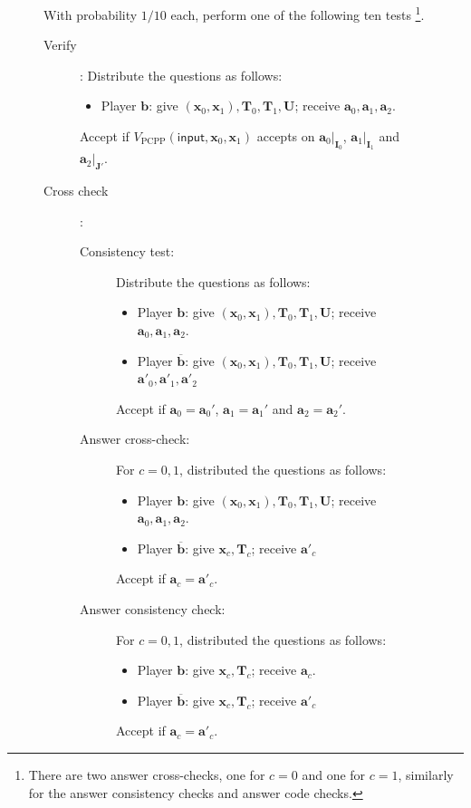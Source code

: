 \documentclass[10pt,a4paper]{article}
\theoremstyle{plain}
\theoremstyle{definition}
\newenvironment{Algorithm}{\begin{framed}}{\end{framed}}
\newcommand{\1}{\mathbb{1}} %
\newcommand{\ba}{\pmb{a}}
\newcommand{\bb}{\pmb{b}}
\newcommand{\bx}{\pmb{x}}
\newcommand{\bI}{\pmb{I}}
\newcommand{\bJ}{\pmb{J}}
\newcommand{\bT}{\pmb{T}}
\newcommand{\bU}{\pmb{U}}
\newcommand{\PCPP}{\mathrm{PCPP}}
\newcommand{\ipt}{\mathsf{input}}
\begin{document}
\begin{figure}
\begin{center}
{\begin{minipage}{0.9\linewidth}
\begin{Algorithm}
            With probability $1/10$ each, perform one of the following ten tests
            \footnote{There are two answer cross-checks, one for $c=0$ and one for $c=1$, similarly for the 
            answer consistency checks and answer code checks.}.
    \begin{description}
    	\item[Verify]: Distribute the questions as follows:
    		\begin{itemize}
    		\item
    		Player $\bb$: give $(\bx_0, \bx_1), \bT_0, \bT_1, \bU$; receive $\ba_0, \ba_1, \ba_2$.
    		\end{itemize}
    	Accept if $V_{\PCPP}(\ipt, \bx_0, \bx_1)$ accepts on $\ba_0|_{\bI_0}$, $\ba_1|_{\bI_1}$ and $\ba_2|_{\bJ'}$.
    	\item[Cross check]: 
    	\begin{description}
    		\item[Consistency test:] Distribute the questions as follows:
    		\begin{itemize}
    		\item
    		Player $\bb$: give $(\bx_0, \bx_1), \bT_0, \bT_1, \bU$; receive $\ba_0, \ba_1, \ba_2$.
    		\item
    		Player $\overline{\bb}$: give $(\bx_0, \bx_1), \bT_0, \bT_1, \bU$; receive $\ba'_0, \ba'_1, \ba'_2$
    		\end{itemize}
    		Accept if $\ba_0 = \ba_0'$, $\ba_1 = \ba_1'$ and $\ba_2 = \ba_2'$.
    		\item[Answer cross-check:] For $c=0,1$, distributed the questions as follows:
    		\begin{itemize}
    		\item
    		Player $\bb$: give $(\bx_0, \bx_1), \bT_0, \bT_1, \bU$; receive $\ba_0, \ba_1, \ba_2$.
    		\item
    		Player $\overline{\bb}$: give $\bx_{c}, \bT_{c}$; receive $\ba'_{c}$
    		\end{itemize}
    		Accept if $\ba_{c} = \ba'_{c}$.
    		\item[Answer consistency check:] For $c = 0, 1$, distributed the questions as follows:
    		\begin{itemize}
    		\item
    		Player $\bb$: give $\bx_{c}, \bT_{c}$; receive $\ba_{c}$.
    		\item
    		Player $\overline{\bb}$: give $\bx_{c}, \bT_{c}$; receive $\ba'_{c}$
    		\end{itemize}
    		Accept if $\ba_{c} = \ba'_{c}$.

\end{description}
\end{description}
\end{Algorithm}
\end{minipage}}
\end{center}
\end{figure}
\end{document}
